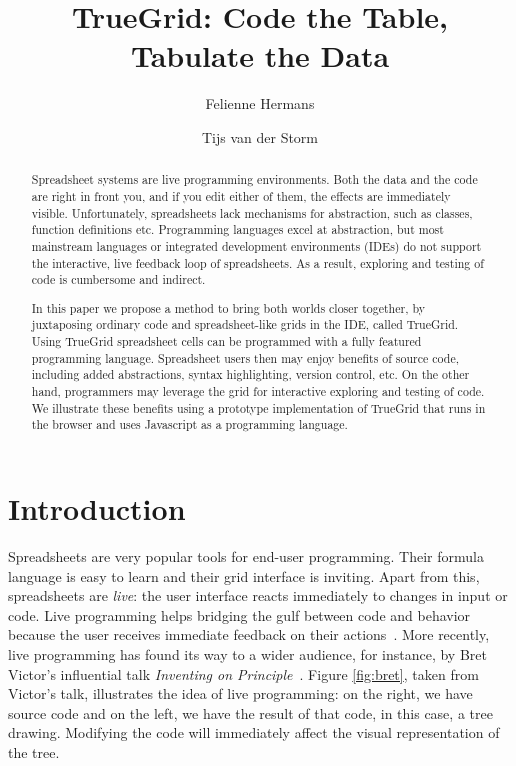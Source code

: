 \documentclass{llncs}
\begin{document}
\title{TrueGrid: Code the Table, Tabulate the Data}
\author{Felienne Hermans \and Tijs van der Storm}
\maketitle
\begin{abstract}
Spreadsheet systems are live programming environments. Both the data and the code are right in front you, and if you edit either of them, the effects are immediately visible. Unfortunately, spreadsheets lack mechanisms for abstraction, such as classes, function definitions etc. Programming languages excel at abstraction, but most mainstream languages or integrated development environments (IDEs) do not support the interactive, live feedback loop of spreadsheets. As a result, exploring and testing of code is cumbersome and indirect. 

In this paper we propose a method to bring both worlds closer together, by juxtaposing ordinary code and spreadsheet-like grids in the IDE, called TrueGrid. Using TrueGrid spreadsheet cells can be programmed with a fully featured programming language. Spreadsheet users then may enjoy benefits of source code, including added abstractions, syntax highlighting, version control, etc. On the other hand, programmers may leverage the grid for interactive exploring and testing of code. 
We illustrate these benefits using a prototype implementation of TrueGrid that runs in the browser and uses Javascript as a programming language.
\end{abstract}

\section{Introduction}
Spreadsheets are very popular tools for end-user programming. Their formula language is easy to learn and their grid interface is inviting. Apart from this, spreadsheets are \textit{live}: the  user interface reacts immediately to changes in input or code.
Live programming helps bridging the gulf between code and behavior because the user receives immediate feedback on their actions~\cite{lieberman1995bridging}.
More recently, live programming has found its way to a wider audience, for instance, by Bret Victor's influential talk \textit{Inventing on Principle}~\cite{Victor2012}. Figure \ref{fig:bret}, taken from Victor's talk, illustrates the idea of live programming: on the right, we have source code and on the left, we have the result of that code, in this case, a tree drawing. Modifying the code will immediately affect the visual representation of the tree.
\end{document}
